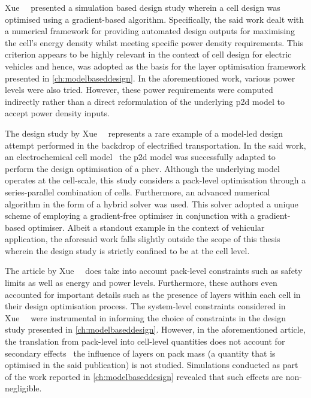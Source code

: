 Xue~\etal~\cite{Xue2013}  presented a  simulation based  design study  wherein a
cell design  was optimised using  a gradient-based algorithm.  Specifically, the
said  work dealt  with  a  numerical framework  for  providing automated  design
outputs for maximising  the cell's energy density whilst  meeting specific power
density  requirements. This  criterion  appears  to be  highly  relevant in  the
context of cell design for electric vehicles and hence, was adopted as the basis
for the layer optimisation framework presented in \cref{ch:modelbaseddesign}. In
the aforementioned  work, various power  levels were also tried.  However, these
power requirements were  computed indirectly rather than  a direct reformulation
of the underlying \gls{p2d} model to accept power density inputs.



The  design   study  by  Xue~\etal~\cite{Xue2014}  represents   a  rare  example
of  a  model-led  design  attempt  performed  in  the  backdrop  of  electrified
transportation.  In  the  said  work, an  electrochemical  cell  model  \viz~the
\gls{p2d} model was successfully adapted to perform the design optimisation of a
\gls{phev}. Although the underlying model operates at the cell-scale, this study
considers  a  pack-level  optimisation  through  a  series-parallel  combination
of  cells.  Furthermore, an  advanced  numerical  algorithm  in  the form  of  a
hybrid  solver was  used. This  solver adopted  a unique  scheme of  employing a
gradient-free optimiser in conjunction with a gradient-based optimiser. Albeit a
standout example  in the  context of vehicular  application, the  aforesaid work
falls slightly  outside the  scope of  this thesis wherein  the design  study is
strictly confined  to be at  the cell level.


The  article  by Xue~\etal~\cite{Xue2014a}  does  take  into account  pack-level
constraints  such  as  safety  limits  as  well  as  energy  and  power  levels.
Furthermore,  these authors  even accounted  for important  details such  as the
presence  of layers  within  each  cell in  their  design optimisation  process.
The  system-level   constraints  considered  in   Xue~\etal~\cite{Xue2014}  were
instrumental  in  informing  the  choice  of constraints  in  the  design  study
presented in \cref{ch:modelbaseddesign}. However, in the aforementioned article,
the translation from pack-level into  cell-level quantities does not account for
secondary effects \ie~the  influence of layers on pack mass  (a quantity that is
optimised in the said publication) is not studied. Simulations conducted as part
of the  work reported in  \cref{ch:modelbaseddesign} revealed that  such effects
are non-negligible.

